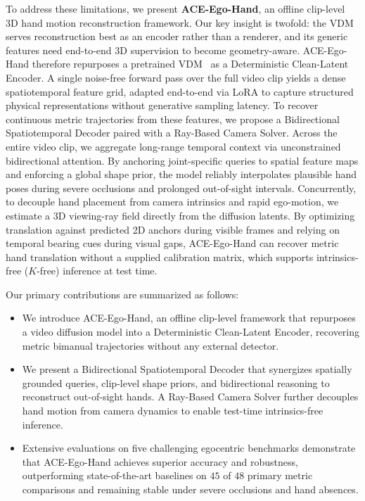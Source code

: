 \documentclass[10pt,twocolumn,letterpaper]{article}
\newcommand{\method}{ACE-Ego-Hand} %
\begin{document}
To address these limitations, we present \textbf{\method{}}, an offline clip-level 3D hand motion reconstruction framework.
Our key insight is twofold: the VDM serves reconstruction best as an encoder rather than a renderer, and its generic features need end-to-end 3D supervision to become geometry-aware. \method{} therefore repurposes a pretrained VDM~\citep{wan2025} as a Deterministic Clean-Latent Encoder. 
A single noise-free forward pass over the full video clip yields a dense spatiotemporal feature grid, adapted end-to-end via LoRA to capture structured physical representations without generative sampling latency.
To recover continuous metric trajectories from these features, we propose a Bidirectional Spatiotemporal Decoder paired with a Ray-Based Camera Solver. 
Across the entire video clip, we aggregate long-range temporal context via unconstrained bidirectional attention. 
By anchoring joint-specific queries to spatial feature maps and enforcing a global shape prior, the model reliably interpolates plausible hand poses during severe occlusions and prolonged out-of-sight intervals.
Concurrently, to decouple hand placement from camera intrinsics and rapid ego-motion, we estimate a 3D viewing-ray field directly from the diffusion latents. 
By optimizing translation against predicted 2D anchors during visible frames and relying on temporal bearing cues during visual gaps, \method{} can recover metric hand translation without a supplied calibration matrix, which supports intrinsics-free ($K$-free) inference at test time.

Our primary contributions are summarized as follows:
\begin{itemize}
\item We introduce \method{}, an offline clip-level framework that repurposes a video diffusion model into a Deterministic Clean-Latent Encoder, recovering metric bimanual trajectories without any external detector.
\item We present a Bidirectional Spatiotemporal Decoder that synergizes spatially grounded queries, clip-level shape priors, and bidirectional reasoning to reconstruct out-of-sight hands. A Ray-Based Camera Solver further decouples hand motion from camera dynamics to enable test-time intrinsics-free inference.
\item Extensive evaluations on five challenging egocentric benchmarks demonstrate that \method{} achieves superior accuracy and robustness, outperforming state-of-the-art baselines on $45$ of $48$ primary metric comparisons and remaining stable under severe occlusions and hand absences.
\end{itemize}
\end{document}
